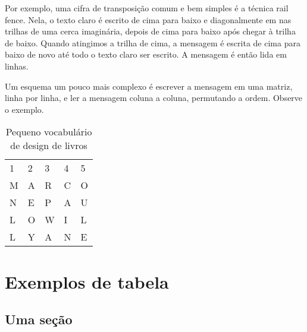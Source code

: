 \documentclass[
	10pt,				%
	openright,			%
	twoside,			%
	a5paper,			%
	english,			%
	french,				%
	spanish,			%
	brazil,				%
	sumario=tradicional
]{abntex2}
\begin{document}
Por exemplo, uma cifra de transposição comum e bem simples é a técnica rail fence. Nela, o texto claro é escrito de cima para baixo e diagonalmente em nas trilhas de uma cerca imaginária, depois de cima para baixo após chegar à trilha de baixo. Quando atingimos a trilha de cima, a mensagem é escrita de cima para baixo de novo até todo o texto claro ser escrito. A mensagem é então lida em linhas.

Um esquema um pouco mais complexo é escrever a mensagem em uma matriz, linha por linha, e ler a mensagem coluna a coluna, permutando a ordem. Observe o exemplo.

\begin{table}
\caption{Pequeno vocabulário de design de livros\label{vocabulario-texto}}
\ABNTEXfontereduzida
\begin{tabular}{p{1cm}p{1cm}p{1cm}p{1cm}p{1cm}}
1 & 2 & 3 & 4 & 5 \\
M & A & R & C & O \\
N & E & P & A & U \\
L & O & W & I & L \\
L & Y & A & N & E
\end{tabular}
\end{table}

\chapter{Exemplos de tabela}

\section{Uma seção}

\lipsum[8]
\end{document}

